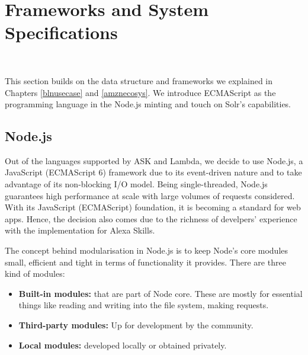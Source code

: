 %




\clearpage
\section{Frameworks and System Specifications}~\label{frameworks_structs}

This section builds on the data structure and frameworks we explained in Chapters \ref{blnusecase} and \ref{amznecosys}. We introduce ECMAScript as the programming language in the Node.js minting and touch on Solr's capabilities.

\subsection*{Node.js}
\label{nodejs:def}
Out of the languages supported by ASK and Lambda, we decide to use Node.js, a JavaScript (ECMAScript 6) framework due to its event-driven nature and to take advantage of its non-blocking I/O model. Being single-threaded, Node.js guarantees high performance at scale with large volumes of requests considered. With its JavaScript (ECMAScript) foundation, %
it is becoming a standard for web apps. Hence, the decision also comes due to the richness of develpers' experience with the implementation for Alexa Skills.

The concept behind modularisation in Node.js is to keep Node's core modules small, efficient and tight in terms of functionality it provides. There are three kind of modules:

\begin{itemize}
\item \textbf{Built-in modules:} that are part of Node core. These are mostly for essential things like reading and writing into the file system, making requests.

\item\textbf{Third-party modules:} Up for development by the community.

\item\textbf{Local modules:} developed locally or obtained privately.

\end{itemize}

